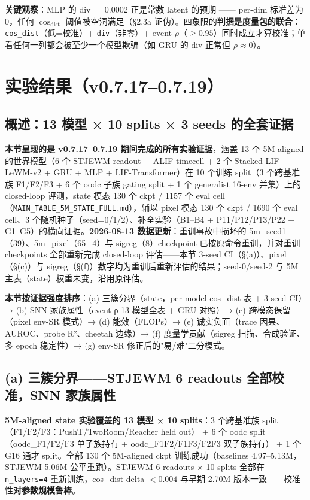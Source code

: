 \documentclass[11pt,a4paper]{article}
\begin{document}
\textbf{关键观察}：MLP 的 div $= 0.0002$ 正是常数 latent 的预期 —— per-dim 标准差为 0，任何 $\cos_\text{dist}$ 阈值被空洞满足（§2.3a 证伪）。四象限的\textbf{判据是度量包的联合}：\texttt{cos\_dist}（低=校准）+ \texttt{div}（非零）+ event-$\rho$（$\geq 0.95$）同时成立才算校准；单看任何一列都会被至少一个模型欺骗（如 GRU 的 div 正常但 $\rho \approx 0$）。

\section{实验结果（v0.7.17--0.7.19）}

\subsection{概述：13 模型 × 10 splits × 3 seeds 的全套证据}

\textbf{本节呈现的是 v0.7.17--0.7.19 期间完成的所有实验证据}，涵盖 13 个 5M-aligned 的世界模型（6 个 STJEWM readout + ALIF-timecell + 2 个 Stacked-LIF + LeWM-v2 + GRU + MLP + LIF-Transformer）在 10 个训练 split（3 个跨基准族 F1/F2/F3 + 6 个 oodc 子族 gating split + 1 个 generalist 16-env 并集）上的 closed-loop 评测，state 模态 130 个 ckpt / 1157 个 eval cell（\texttt{MAIN\_TABLE\_5M\_STATE\_FULL.md}），辅以 pixel 模态 130 个 ckpt / 1690 个 eval cell、3 个随机种子（seed=0/1/2）、补全实验（B1--B4 + P11/P12/P13/P22 + G1--G5）的横向证据。\textbf{2026-08-13 数据更新}：重训事故中损坏的 5m\_seed1（39）、5m\_pixel（65+4）与 sigreg（8）checkpoint 已按原命令重训，并对重训 checkpoints 全部重新完成 closed-loop 评估——本节 3-seed CI（§(a)）、pixel（§(c)）与 sigreg（§(f)）数字均为重训后重新评估的结果；seed-0/seed-2 与 5M 主表（state）权重未变，沿用原评估。

\textbf{本节按证据强度排序}：(a) 三簇分界（state，per-model cos\_dist 表 + 3-seed CI）→ (b) SNN 家族属性（event-ρ 13 模型全表 + GRU 对照）→ (c) 跨模态保留（pixel env-SR 模式）→ (d) 能效（FLOPs）→ (e) 诚实负面（trace 因果、AUROC、probe R²、cheetah 边缘）→ (f) 度量学贡献（sigreg 扫描、合成验证、多 epoch 稳定性）→ (g) env-SR 修正后的"易/难"二分模式。

\subsection{(a) 三簇分界——STJEWM 6 readouts 全部校准，SNN 家族属性}

\textbf{5M-aligned state 实验覆盖的 13 模型 × 10 splits}：3 个跨基准族 split（F1/F2/F3：PushT/TwoRoom/Reacher held out） + 6 个 oodc split（oodc\_F1/F2/F3 单子族持有 + oodc\_F1F2/F1F3/F2F3 双子族持有） + 1 个 G16 通才 split。全部 130 个 5M-aligned ckpt 训练成功（baselines 4.97--5.13M，STJEWM 5.06M 公平重跑）。STJEWM 6 readouts × 10 splits 全部在 \texttt{n\_layers=4} 重新训练，cos\_dist delta $< 0.004$ 与早期 2.70M 版本一致——校准性\textbf{对参数规模鲁棒}。
\end{document}
